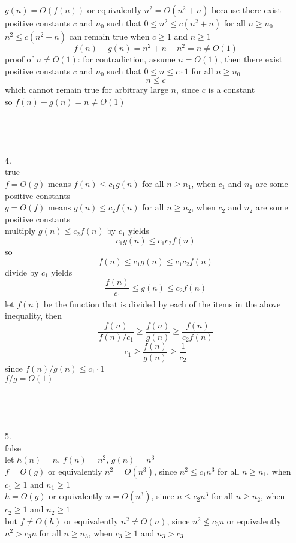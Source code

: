 \documentclass[12pt,border=4pt,multi]{article}%
\begin{document}
$g(n) = O(f(n))$ or equivalently $n^2 = O(n^2 + n)$ because there exist positive constants $c$ and $n_0$ such that $0 \leq n^2 \leq c (n^2 + n)$ for all $n \geq n_0$\\
$n^2 \leq c (n^2 + n)$ can remain true when $c \geq 1$ and $n \geq 1$
\[f(n) - g(n) = n^2 + n - n^2 = n \not= O(1)\]
proof of $n \not= O(1)$: for contradiction, assume $n = O(1)$, then there exist positive constants $c$ and $n_0$ such that $0 \leq n \leq c \cdot 1$ for all $n \geq n_0$\\
\[n \leq c\]
which cannot remain true for arbitrary large $n$, since $c$ is a constant\\
so $f(n) - g(n) = n \not= O(1)$\\
\\
\\
\\
\\
4.\\
true\\
$f = O(g)$ means $f(n) \leq c_1 g(n)$ for all $n \geq n_1$, when $c_1$ and $n_1$ are some positive constants\\
$g = O(f)$ means $g(n) \leq c_2 f(n)$ for all $n \geq n_2$, when $c_2$ and $n_2$ are some positive constants\\
multiply $g(n) \leq c_2 f(n)$ by $c_1$ yields
\[c_1 g(n) \leq c_1 c_2 f(n)\]
so 
\[f(n) \leq c_1 g(n) \leq c_1 c_2 f(n)\]
divide by $c_1$ yields
\[\frac{f(n)}{c_1} \leq g(n) \leq c_2 f(n)\]
let $f(n)$ be the function that is divided by each of the items in the above inequality, then 
\[\frac{f(n)}{f(n)/c_1} \geq \frac{f(n)}{g(n)} \geq \frac{f(n)}{c_2 f(n)}\]
\[c_1 \geq \frac{f(n)}{g(n)} \geq \frac{1}{c_2}\]
since $f(n) / g(n) \leq c_1 \cdot 1$\\ 
$f / g = O(1)$\\ 
\\
\\
\\
\\
5.\\
false\\
let $h(n) = n$, $f(n) = n^2$, $g(n) = n^3$\\
$f = O(g)$ or equivalently $n^2 = O(n^3)$, since $n^2 \leq c_1 n^3$ for all $n \geq n_1$, when $c_1 \geq 1$ and $n_1 \geq 1$\\
$h = O(g)$ or equivalently $n = O(n^3)$, since $n \leq c_2 n^3$ for all $n \geq n_2$, when $c_2 \geq 1$ and $n_2 \geq 1$\\
but $f \not= O(h)$ or equivalently $n^2 \not= O(n)$, since $n^2 \not\leq c_3 n$ or equivalently $n^2 > c_3 n$ for all $n \geq n_3$, when $c_3 \geq 1$ and $n_3 > c_3$\\
\end{document}
